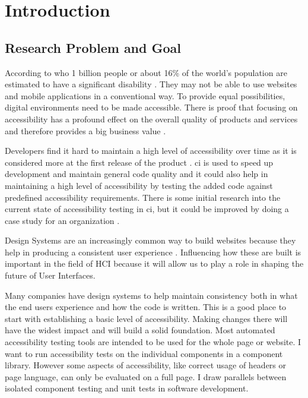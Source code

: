 \documentclass{master_thesis}
\begin{document}
\section{Introduction}

\subsection{Research Problem and Goal}


According to \ac{who} 1 billion people or about 16\% of the world's population are estimated to have a significant disability \citep{WHO2022}. They may not be able to use websites and mobile applications in a conventional way. To provide equal possibilities, digital environments need to be made accessible. There is proof that focusing on accessibility has a profound effect on the overall quality of products and services and therefore provides a big business value \citep{Miesenberger2020}.

Developers find it hard to maintain a high level of accessibility over time as it is considered more at the first release of the product \citep{Paterno2020}. \ac{ci} is used to speed up development and maintain general code quality \citep{Zhao2017} and it could also help in maintaining a high level of accessibility by testing the added code against predefined accessibility requirements. There is some initial research into the current state of accessibility testing in \ac{ci}, but it could be improved by doing a case study for an organization \citep{Sane2021}.

Design Systems are an increasingly common way to build websites because they help in producing a consistent user experience \citep{Yew2020}. Influencing how these are built is important in the field of HCI because it will allow us to play a role in shaping the future of User Interfaces.

Many companies have design systems to help maintain consistency both in what the end users experience and how the code is written. This is a good place to start with establishing a basic level of accessibility. Making changes there will have the widest impact and will build a solid foundation. Most automated accessibility testing tools are intended to be used for the whole page or website. I want to run accessibility tests on the individual components in a component library. However some aspects of accessibility, like correct usage of headers or page language, can only be evaluated on a full page. I draw parallels between isolated component testing and unit tests in software development.
\end{document}
